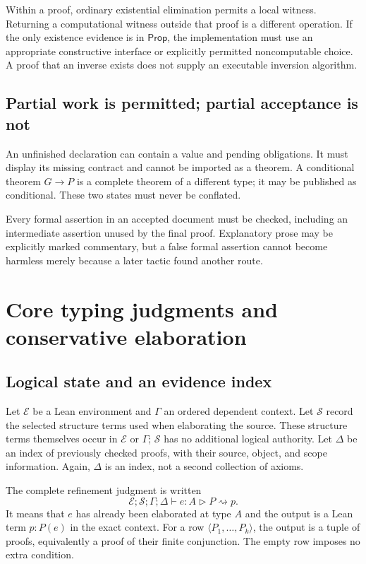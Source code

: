 \documentclass[11pt,a4paper]{article}
\theoremstyle{definition}
\theoremstyle{remark}
\newcommand{\Prop}{\ensuremath{\mathsf{Prop}}}
\newcommand{\row}[1]{\langle #1\rangle}
\newcommand{\sig}{\mathcal S}
\begin{document}
Within a proof, ordinary existential elimination permits a local witness. Returning a computational witness outside that proof is a different operation. If the only existence evidence is in \Prop, the implementation must use an appropriate constructive interface or explicitly permitted noncomputable choice. A proof that an inverse exists does not supply an executable inversion algorithm.

\subsection{Partial work is permitted; partial acceptance is not}
An unfinished declaration can contain a value and pending obligations. It must display its missing contract and cannot be imported as a theorem. A conditional theorem $G\to P$ is a complete theorem of a different type; it may be published as conditional. These two states must never be conflated.

Every formal assertion in an accepted document must be checked, including an intermediate assertion unused by the final proof. Explanatory prose may be explicitly marked commentary, but a false formal assertion cannot become harmless merely because a later tactic found another route.

\section{Core typing judgments and conservative elaboration}
\label{sec:core}

\subsection{Logical state and an evidence index}
Let $\mathcal E$ be a Lean environment and $\Gamma$ an ordered dependent context. Let $\sig$ record the selected structure terms used when elaborating the source. These structure terms themselves occur in $\mathcal E$ or $\Gamma$; $\sig$ has no additional logical authority. Let $\Delta$ be an index of previously checked proofs, with their source, object, and scope information. Again, $\Delta$ is an index, not a second collection of axioms.

The complete refinement judgment is written
\[
 \mathcal E;\sig;\Gamma;\Delta\vdash
 e:A\triangleright P \rightsquigarrow p.
\]
It means that $e$ has already been elaborated at type $A$ and the output is a Lean term $p:P(e)$ in the exact context. For a row $\row{P_1,\ldots,P_k}$, the output is a tuple of proofs, equivalently a proof of their finite conjunction. The empty row imposes no extra condition.
\end{document}
